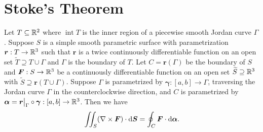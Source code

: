 \section{Stoke's Theorem}
\begin{theoremenv}
    Let $T\subseteq \mathbb{R}^2$ where $\operatorname{int} T$ is the inner region of a piecewise smooth Jordan curve $\Gamma$. Suppose $S$ is a simple smooth parametric surface with parametrization $\bm r: T\to \mathbb{R}^3$ such that $\bm r$ is a twice continuously differentiable function on an open set $\widetilde{T} \supseteq T \cup \Gamma$ and $\Gamma$ is the boundary of $T$. Let $C= \bm r(\Gamma)$ be the boundary of $S$ and $\bm F: S\to \mathbb{R}^3$ be a continuously differentiable function on an open set $\widetilde{S} \supseteq \mathbb{R}^3$ with $\widetilde{S} \supseteq \bm r(T \cup \Gamma)$. Suppose $\Gamma$ is parametrized by $\bm \gamma: [a,b]\to \Gamma$, traversing the Jordan curve $\Gamma$ in the counterclockwise direction, and $C$ is parametrized by $\bm \alpha = \bm r\big|_\Gamma \circ \bm \gamma: [a,b] \to \mathbb{R}^3$. Then we have
    $$ \iint_S (\nabla\times \bm F) \cdot \dd \bm S = \oint_C \bm F \cdot \dd \bm \alpha. $$
\end{theoremenv}
